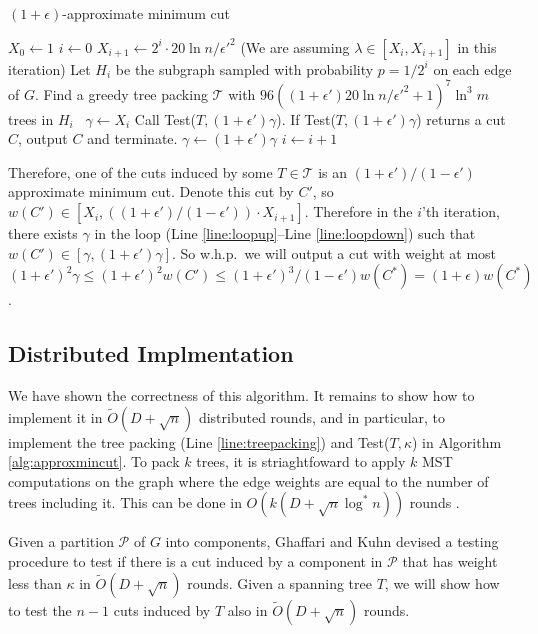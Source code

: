 \documentclass[11pt]{article}
\begin{document}
\begin{algorithm}[H]
\caption{$(1+\epsilon)$-approximate minimum cut}
\begin{algorithmic}[1]\label{alg:approxmincut}
\STATE $X_0 \leftarrow 1$
\STATE $i \leftarrow 0$
\REPEAT
\STATE $X_{i+1} \leftarrow 2^{i} \cdot 20\ln n /\epsilon'^2$
\STATE (We are assuming $\lambda \in [X_{i}, X_{i+1}]$ in this iteration)
\STATE Let $H_i$ be the subgraph sampled with probability $p = 1/2^{i}$ on each edge of $G$.
\STATE \label{line:treepacking}Find a greedy tree packing $\mathcal{T}$ with $96((1+\epsilon')20\ln n/\epsilon'^2 + 1)^{7} \ln^{3} m$ trees in $H_i$
\
\STATE $\gamma \leftarrow X_{i}$
\REPEAT \label{line:loopup}
\STATE Call Test($T,(1+\epsilon')\gamma$).
\STATE If Test($T,(1+\epsilon')\gamma$) returns a cut $C$, output $C$ and terminate.
\ENDFOR
\STATE $\gamma \leftarrow (1+\epsilon')\gamma$
 \label{line:loopdown}
\STATE $i \leftarrow i+1$
\end{algorithmic}
\end{algorithm}


Therefore, one of the cuts induced by some $T \in \mathcal{T}$ is an $(1+\epsilon')/(1-\epsilon')$ approximate minimum cut. Denote this cut by $C'$, so $w(C') \in [X_i, ((1+\epsilon')/(1-\epsilon')) \cdot X_{i+1}]$. Therefore in the $i$'th iteration, there exists $\gamma$ in the loop (Line \ref{line:loopup}--Line \ref{line:loopdown}) such that $w(C') \in [\gamma, (1+\epsilon')\gamma]$. So w.h.p.\ we will output a cut with weight at most $(1+\epsilon')^2\gamma \leq (1+\epsilon')^2w(C') \leq (1+\epsilon')^3/(1-\epsilon')w(C^{*}) = (1+\epsilon)w(C^{*})$.

\subsection{Distributed Implmentation}

We have shown the correctness of this algorithm. It remains to show how to implement it in $\tilde{O}(D+\sqrt{n})$ distributed rounds, and in particular, to implement the tree packing (Line \ref{line:treepacking}) and Test($T,\kappa$) in Algorithm \ref{alg:approxmincut}. To pack $k$ trees, it is striaghtfoward to apply $k$ MST computations on the graph where the edge weights are equal to the number of trees including it. This can be done in $O(k(D + \sqrt{n} \log^{*} n))$ rounds \cite{KP95}.

Given a partition $\mathcal{P}$ of $G$ into components, Ghaffari and Kuhn \cite{GK13} devised a testing procedure to test if there is a cut induced by a component in $\mathcal{P}$ that has weight less than $\kappa$ in $\widetilde{O}(D+\sqrt{n})$ rounds. Given a spanning tree $T$, we will show how to test the $n-1$ cuts induced by $T$ also in $\widetilde{O}(D+\sqrt{n})$ rounds. 
\end{document}
